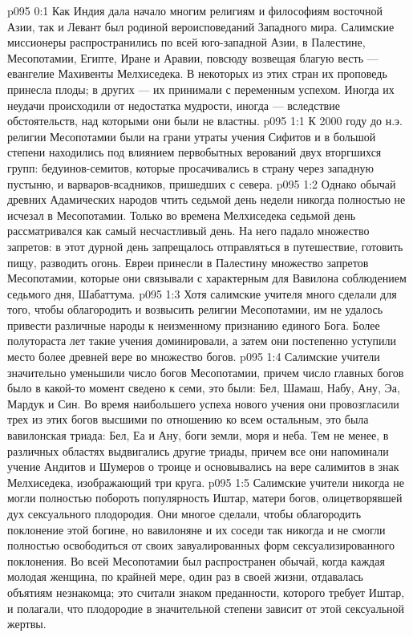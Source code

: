 \vs p095 0:1 Как Индия дала начало многим религиям и философиям восточной Азии, так и Левант был родиной вероисповеданий Западного мира. Салимские миссионеры распространились по всей юго\hyp{}западной Азии, в Палестине, Месопотамии, Египте, Иране и Аравии, повсюду возвещая благую весть --- евангелие Махивенты Мелхиседека. В некоторых из этих стран их проповедь принесла плоды; в других --- их принимали с переменным успехом. Иногда их неудачи происходили от недостатка мудрости, иногда --- вследствие обстоятельств, над которыми они были не властны.
\vs p095 1:1 К 2000 году до н.э. религии Месопотамии были на грани утраты учения Сифитов и в большой степени находились под влиянием первобытных верований двух вторгшихся групп: бедуинов\hyp{}семитов, которые просачивались в страну через западную пустыню, и варваров\hyp{}всадников, пришедших с севера.
\vs p095 1:2 Однако обычай древних Адамических народов чтить седьмой день недели никогда полностью не исчезал в Месопотамии. Только во времена Мелхиседека седьмой день рассматривался как самый несчастливый день. На него падало множество запретов: в этот дурной день запрещалось отправляться в путешествие, готовить пищу, разводить огонь. Евреи принесли в Палестину множество запретов Месопотамии, которые они связывали с характерным для Вавилона соблюдением седьмого дня, Шабаттума.
\vs p095 1:3 Хотя салимские учителя много сделали для того, чтобы облагородить и возвысить религии Месопотамии, им не удалось привести различные народы к неизменному признанию единого Бога. Более полутораста лет такие учения доминировали, а затем они постепенно уступили место более древней вере во множество богов.
\vs p095 1:4 Салимские учители значительно уменьшили число богов Месопотамии, причем число главных богов было в какой\hyp{}то момент сведено к семи, это были: Бел, Шамаш, Набу, Ану, Эа, Мардук и Син. Во время наибольшего успеха нового учения они провозгласили трех из этих богов высшими по отношению ко всем остальным, это была вавилонская триада: Бел, Еа и Ану, боги земли, моря и неба. Тем не менее, в различных областях выдвигались другие триады, причем все они напоминали учение Андитов и Шумеров о троице и основывались на вере салимитов в знак Мелхиседека, изображающий три круга.
\vs p095 1:5 Салимские учители никогда не могли полностью побороть популярность Иштар, матери богов, олицетворявшей дух сексуального плодородия. Они многое сделали, чтобы облагородить поклонение этой богине, но вавилоняне и их соседи так никогда и не смогли полностью освободиться от своих завуалированных форм сексуализированного поклонения. Во всей Месопотамии был распространен обычай, когда каждая молодая женщина, по крайней мере, один раз в своей жизни, отдавалась объятиям незнакомца; это считали знаком преданности, которого требует Иштар, и полагали, что плодородие в значительной степени зависит от этой сексуальной жертвы.
